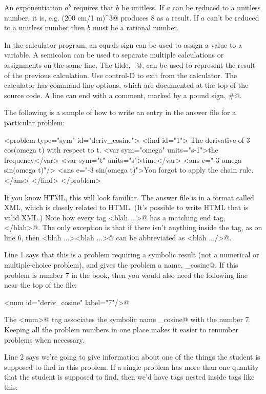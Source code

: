 \documentclass{doc}
\begin{document}
An exponentiation $a^b$ requires that $b$ be unitless.
If $a$ can be reduced to a unitless number, it is, e.g.
\verb@(200 cm/1 m)^3@ produces 8 as a result.
If $a$ can't be reduced to a unitless number then
$b$ must be a rational number.

In the calculator program, an equals sign can be used to assign a value
to a variable. A semicolon can be used to separate multiple calculations
or assignments on the same line. The tilde, \verb@~@, can be used to
represent the result of the previous calculation. Use control-D to exit
from the calculator. The calculator has command-line options, which are
documented at the top of the source code. A line can end with a comment,
marked by a pound sign, \verb@#@.

\label{answerfile}
The following is a sample of how to write an entry in the answer file
for a particular problem:
\begin{listing}{1}
<problem type="sym" id="deriv_cosine">
  <find id="1">
    The derivative of 3 cos(omega t) with respect to t.
    <var sym="omega" units="s-1">the frequency</var>
    <var sym="t" units="s">time</var>
    <ans  e="-3 omega sin(omega t)"/>
    <ans e="-3 sin(omega t)">You forgot to apply the chain rule.</ans>
  </find>
</problem>
\end{listing}

If you know HTML, this will look familiar. The answer file is in a format
called XML, which is closely related to HTML. (It's possible to write HTML
that is valid XML.) Note how every tag \verb@<blah ...>@ has a matching
end tag, \verb@</blah>@. The only exception is that if there isn't anything inside
the tag, as on line 6, then \verb@<blah ...><blah ...>@ can be abbreviated as
\verb@<blah .../>@. 

Line 1 says that this is a problem requiring a symbolic result (not a numerical
or multiple-choice problem), and gives the problem a name, \verb@deriv_cosine@.
If this problem is number 7 in the book, then you would also
need the following line near the top of the file:

\noindent\verb@<num id="deriv_cosine" label="7"/>@

The \verb@<num>@ tag associates the symbolic name \verb@deriv_cosine@
with the number 7. Keeping all the problem numbers in one place
makes it easier to renumber problems when necessary.

Line 2 says we're going to give information about one of the things
the student is supposed to find in this problem. If a single problem has
more than one quantity that the student is supposed to find, then we'd
have \verb@find@ tags nested inside \verb@problem@ tags like this:
\end{document}
